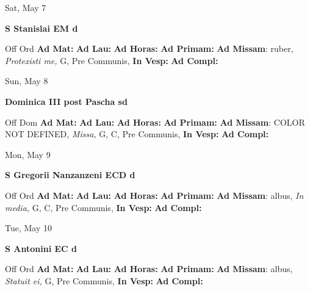 \documentclass[10pt]{book}
\begin{document}
\begin{center}
\begin{minipage}{3.5in}
\vspace{2em}
\begin{center}Sat, May 7
\end{center}
\textbf{ \large S Stanislai EM
\textnormal{\normalsize d}}

\begin{justify}Off Ord
\textbf{Ad Mat: }
\textbf{Ad Lau: }
\textbf{Ad Horas: }
\textbf{Ad Primam: }\textbf{Ad Missam}: ruber, \textit{Protexisti me,} G, Pre Communis, 
\textbf{In Vesp: }
\textbf{Ad Compl: }
\end{justify}
\end{minipage}
\end{center}

\begin{center}
\begin{minipage}{3.5in}
\vspace{2em}
\begin{center}Sun, May 8
\end{center}
\textbf{ \large Dominica III post Pascha
\textnormal{\normalsize sd}}

\begin{justify}Off Dom
\textbf{Ad Mat: }
\textbf{Ad Lau: }
\textbf{Ad Horas: }
\textbf{Ad Primam: }\textbf{Ad Missam}: COLOR NOT DEFINED, \textit{Missa,} G, C, Pre Communis, 
\textbf{In Vesp: }
\textbf{Ad Compl: }
\end{justify}
\end{minipage}
\end{center}

\begin{center}
\begin{minipage}{3.5in}
\vspace{2em}
\begin{center}Mon, May 9
\end{center}
\textbf{ \large S Gregorii Nanzanzeni ECD
\textnormal{\normalsize d}}

\begin{justify}Off Ord
\textbf{Ad Mat: }
\textbf{Ad Lau: }
\textbf{Ad Horas: }
\textbf{Ad Primam: }\textbf{Ad Missam}: albus, \textit{In media,} G, C, Pre Communis, 
\textbf{In Vesp: }
\textbf{Ad Compl: }
\end{justify}
\end{minipage}
\end{center}

\begin{center}
\begin{minipage}{3.5in}
\vspace{2em}
\begin{center}Tue, May 10
\end{center}
\textbf{ \large S Antonini EC
\textnormal{\normalsize d}}

\begin{justify}Off Ord
\textbf{Ad Mat: }
\textbf{Ad Lau: }
\textbf{Ad Horas: }
\textbf{Ad Primam: }\textbf{Ad Missam}: albus, \textit{Statuit ei,} G, Pre Communis, 
\textbf{In Vesp: }
\textbf{Ad Compl: }
\end{justify}
\end{minipage}
\end{center}
\end{document}
